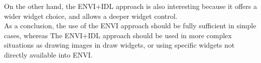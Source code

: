 On the other hand, the ENVI+IDL approach is also interesting because it offers a wider widget choice, and allows a deeper widget control.
\\
As a conclusion, the use of the ENVI approach should be fully sufficient in simple cases, whereas The ENVI+IDL approach should be used in more complex situations as drawing images in draw widgets, or using specific widgets not directly available into ENVI.

